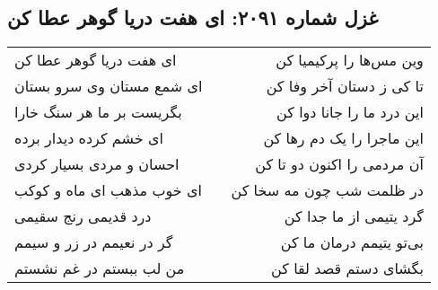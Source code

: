\begin{center}
\section*{غزل شماره ۲۰۹۱: ای هفت دریا گوهر عطا کن}
\label{sec:2091}
\begin{longtable}{l p{0.5cm} r}
ای هفت دریا گوهر عطا کن
&&
وین مس‌ها را پرکیمیا کن
\\
ای شمع مستان وی سرو بستان
&&
تا کی ز دستان آخر وفا کن
\\
بگریست بر ما هر سنگ خارا
&&
این درد ما را جانا دوا کن
\\
ای خشم کرده دیدار برده
&&
این ماجرا را یک دم رها کن
\\
احسان و مردی بسیار کردی
&&
آن مردمی را اکنون دو تا کن
\\
ای خوب مذهب ای ماه و کوکب
&&
در ظلمت شب چون مه سخا کن
\\
درد قدیمی رنج سقیمی
&&
گرد یتیمی از ما جدا کن
\\
گر در نعیمم در زر و سیمم
&&
بی‌تو یتیمم درمان ما کن
\\
من لب ببستم در غم نشستم
&&
بگشای دستم قصد لقا کن
\\
\end{longtable}
\end{center}
